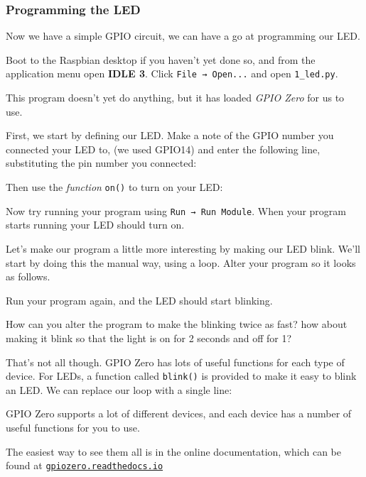 		\subsubsection{Programming the LED}
		
			Now we have a simple GPIO circuit, we can have a go at programming our LED.
			
			Boot to the Raspbian desktop if you haven't yet done so, and from the application menu open \textbf{IDLE 3}. Click \mbox{\texttt{File → Open...}} and open \texttt{1\_led.py}.
			
			
			
			This program doesn't yet do anything, but it has loaded \textit{GPIO Zero} for us to use.
			
			First, we start by defining our LED. Make a note of the GPIO number you connected your LED to, (we used GPIO14) and enter the following line, substituting the pin number you connected:
			
			
			
			Then use the \textit{function} \texttt{on()} to turn on your LED:
			
			
			
			Now try running your program using \mbox{\texttt{Run → Run Module}}. When your program starts running your LED should turn on.
			
			Let's make our program a little more interesting by making our LED blink. We'll start by doing this the manual way, using a loop. Alter your program so it looks as follows.
			
			
			
			Run your program again, and the LED should start blinking.
			
			How can you alter the program to make the blinking twice as fast? how about making it blink so that the light is on for 2 seconds and off for 1?
			
			That's not all though. GPIO Zero has lots of useful functions for each type of device. For LEDs, a function called \texttt{blink()} is provided to make it easy to blink an LED. We can replace our loop with a single line:
			
			
			
			\begin{aside}
				GPIO Zero supports a lot of different devices, and each device has a number of useful functions for you to use.
				
				The easiest way to see them all is in the online documentation, which can be found at \href{https://gpiozero.readthedocs.io/}{\texttt{gpiozero.readthedocs.io}}
			\end{aside}
			
